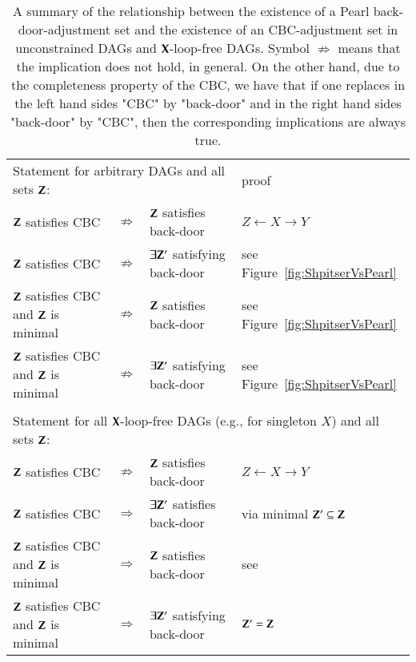 \begin{table}
\begin{center}
\begin{tabular}{lcll}
\multicolumn{3}{l}{Statement for arbitrary DAGs and all sets ${\bf Z}$:}& proof  \\[1mm]  %
	${\bf Z}$ satisfies CBC                              & $\not\Rightarrow$ & ${\bf Z}$ satisfies back-door          & $ Z \gets X \to Y $                  \\
	${\bf Z}$ satisfies CBC                              & $\not\Rightarrow$ & $\exists{\bf Z}'$ satisfying back-door & see Figure~\ref{fig:ShpitserVsPearl} \\
	${\bf Z}$ satisfies CBC   and $ {\bf Z} $ is minimal     & $\not\Rightarrow$ & ${\bf Z}$ satisfies back-door          & see Figure~\ref{fig:ShpitserVsPearl} \\
	${\bf Z}$ satisfies CBC   and $ {\bf Z} $ is minimal     & $\not\Rightarrow$ & $\exists{\bf Z}'$ satisfying back-door & see Figure~\ref{fig:ShpitserVsPearl} \\
	\\[-3mm]
\multicolumn{4}{l}{Statement for all ${\bf X}$-loop-free DAGs (e.g., for singleton $X$)  and all sets ${\bf Z}$:}\\[1mm]
	${\bf Z}$ satisfies CBC                              &$\not\Rightarrow$ & ${\bf Z}$ satisfies back-door          & $ Z \gets X \to Y $              \\
	${\bf Z}$ satisfies CBC                              &  $\Rightarrow$   & $\exists{\bf Z}'$ satisfies back-door  & via minimal $ {\bf Z}'\subseteq{\bf Z} $ \\
	${\bf Z}$ satisfies CBC   and $ {\bf Z} $ is minimal     &  $\Rightarrow$   & ${\bf Z}$ satisfies back-door          & see \cite{TextorLiskiewicz2011}  \\
	${\bf Z}$ satisfies CBC   and $ {\bf Z} $ is minimal     &  $\Rightarrow$   & $\exists{\bf Z}'$ satisfying back-door & ${\bf Z}'={\bf Z}$     
\end{tabular}
\end{center}\vspace*{-3mm}
\caption{A summary of the relationship between the existence of a Pearl back-door-adjustment set
and the existence of an CBC-adjustment set  in unconstrained DAGs and ${\bf X}$-loop-free DAGs. 
Symbol $\not\Rightarrow$ means that the implication does not hold, in general.
On the other hand, due to the completeness property of the CBC, we have that 
if one replaces in the left hand sides  "CBC" by "back-door" and in the right
hand sides  "back-door" by "CBC", then  the corresponding implications are always true.}
\label{tab:bdc:vs:cbc}
\end{table}


